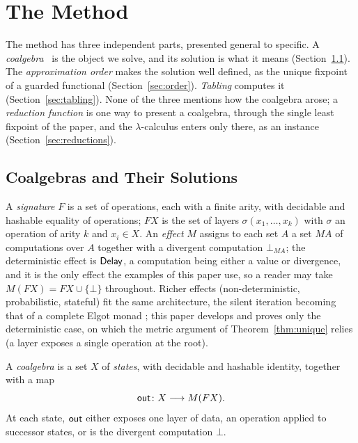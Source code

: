 \section{The Method}\label{sec:method}
The method has three independent parts, presented general to specific. A
\emph{coalgebra}~\cite{rutten2000-universal-coalgebra} is
the object we solve, and its solution is what it means (Section~\ref{sec:coalgebras}). The
\emph{approximation order} makes the solution well defined, as the unique fixpoint of a guarded
functional (Section~\ref{sec:order}). \emph{Tabling} computes it (Section~\ref{sec:tabling}).
None of the three mentions how the coalgebra arose; a \emph{reduction function} is one way to
present a coalgebra, through the single least fixpoint of the paper, and the
$\lambda$-calculus enters only there, as an instance (Section~\ref{sec:reductions}).

\subsection{Coalgebras and Their Solutions}\label{sec:coalgebras}

\begin{definition}\label{def:signature}
  A \emph{signature} $F$ is a set of operations, each with a finite arity, with decidable and
  hashable equality of operations; $F X$ is the set of layers $\sigma(x_1,\dots,x_k)$ with
  $\sigma$ an operation of arity $k$ and $x_i \in X$. An \emph{effect} $M$ assigns to each set
  $A$ a set $M A$ of computations over $A$ together with a divergent computation
  $\bot_{MA}$; the deterministic effect is $\mathsf{Delay}$, a computation being either a value or
  divergence, and it is the only effect the examples of this paper use, so a reader may take
  $M(F X) = F X \cup \{\bot\}$ throughout. Richer effects (non-deterministic, probabilistic,
  stateful) fit the same architecture, the silent iteration becoming that of a complete Elgot
  monad \cite{adamek2006-iterative-algebras, goncharov2016-complete-elgot-monads}; this paper
  develops and proves only the deterministic case, on which the metric argument of
  Theorem~\ref{thm:unique} relies (a layer exposes a single operation at the root).
\end{definition}

\begin{definition}[Coalgebra]\label{def:coalgebra}
  A \emph{coalgebra} is a set $X$ of \emph{states}, with decidable and hashable identity,
  together with a map
  \[
    \mathsf{out} \colon X \longrightarrow M(F X).
  \]
  At each state, $\mathsf{out}$ either exposes one layer of data, an operation applied to successor
  states, or is the divergent computation $\bot$.
\end{definition}

